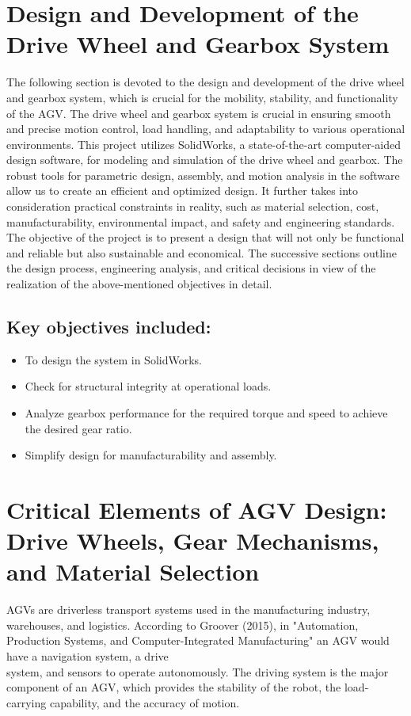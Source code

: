\documentclass[../../main]{subfiles}
\begin{document}
\section{Design and Development of the Drive Wheel and Gearbox System}


The following section is devoted to the design and development of the drive wheel and gearbox system, which is crucial for the mobility, stability, and functionality of the AGV.
The drive wheel and gearbox system is crucial in ensuring smooth and precise motion control, load handling, and adaptability to various operational environments. This project utilizes SolidWorks, a state-of-the-art computer-aided design software, for modeling and simulation of the drive wheel and gearbox. The robust tools for parametric design, assembly, and motion analysis in the software allow us to create an efficient and optimized design. It further takes into consideration practical constraints in reality, such as material selection, cost, manufacturability, environmental impact, and safety and engineering standards.
The objective of the project is to present a design that will not only be functional and reliable but also sustainable and economical. The successive sections outline the design process, engineering analysis, and critical decisions in view of the realization of the above-mentioned objectives in detail.

\subsection*{Key objectives included:}

\begin{itemize}
\item
  To design the system in SolidWorks.
\item
  Check for structural integrity at operational loads.
\item
  Analyze gearbox performance for the required torque and speed to
  achieve the desired gear ratio.
\item
  Simplify design for manufacturability and assembly.
\end{itemize}
\newpage
\section[Critical Elements of AGV Design]{Critical Elements of AGV Design: Drive Wheels, Gear Mechanisms, and Material Selection}

AGVs are driverless transport systems used in the manufacturing
industry, warehouses, and logistics. According to Groover (2015)\cite{groover2016automation}, in
"Automation, Production Systems, and Computer-Integrated Manufacturing"
an AGV would have a navigation system, a drive \\system, and sensors to
operate autonomously. The driving system is the major component of an
AGV, which provides the stability of the robot, the load-carrying
capability, and the accuracy of motion.
\end{document}
